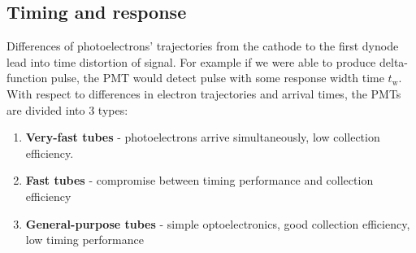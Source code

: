 
\subsection{Timing and response}
Differences of photoelectrons' trajectories from the cathode to the first dynode lead into time distortion of signal. For example if we were able to produce delta-function pulse, the PMT would detect pulse with some response width time $t_\textrm{w}$.
With respect to differences in electron trajectories and arrival times, the PMTs are divided into 3 types:
\begin{enumerate}
\item \textbf{Very-fast tubes} - photoelectrons arrive simultaneously, low collection efficiency.
\item \textbf{Fast tubes} - compromise between timing performance and collection efficiency
\item \textbf{General-purpose tubes} - simple optoelectronics, good collection efficiency, low timing performance
\end{enumerate}

